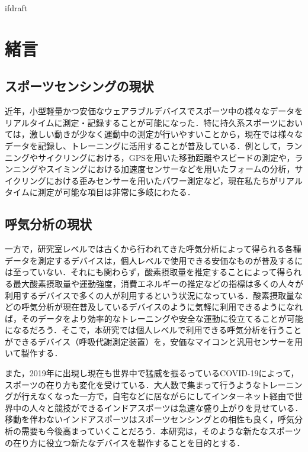 \expandafter\ifx\csname ifdraft\endcsname\relax
 
\fi

\section{緒言}

\subsection{スポーツセンシングの現状}

近年，小型軽量かつ安価なウェアラブルデバイスでスポーツ中の様々なデータをリアルタイムに測定・記録することが可能になった．特に持久系スポーツにおいては，激しい動きが少なく運動中の測定が行いやすいことから，現在では様々なデータを記録し、トレーニングに活用することが普及している．例として，ランニングやサイクリングにおける，GPSを用いた移動距離やスピードの測定や，ランニングやスイミングにおける加速度センサーなどを用いたフォームの分析，サイクリングにおける歪みセンサーを用いたパワー測定など，現在私たちがリアルタイムに測定が可能な項目は非常に多岐にわたる．

\subsection{呼気分析の現状}

一方で，研究室レベルでは古くから行われてきた呼気分析によって得られる各種データを測定するデバイスは，個人レベルで使用できる安価なものが普及するには至っていない．それにも関わらず，酸素摂取量を推定することによって得られる最大酸素摂取量や運動強度，消費エネルギーの推定などの指標は多くの人々が利用するデバイスで多くの人が利用するという状況になっている．酸素摂取量などの呼気分析が現在普及しているデバイスのように気軽に利用できるようになれば，そのデータをより効率的なトレーニングや安全な運動に役立てることが可能になるだろう．そこで，本研究では個人レベルで利用できる呼気分析を行うことができるデバイス（呼吸代謝測定装置）を，安価なマイコンと汎用センサーを用いて製作する．

また，2019年に出現し現在も世界中で猛威を振るっているCOVID-19によって，スポーツの在り方も変化を受けている．大人数で集まって行うようなトレーニングが行えなくなった一方で，自宅などに居ながらにしてインターネット経由で世界中の人々と競技ができるインドアスポーツは急速な盛り上がりを見せている．移動を伴わないインドアスポーツはスポーツセンシングとの相性も良く，呼気分析の需要も今後高まっていくことだろう．本研究は，そのような新たなスポーツの在り方に役立つ新たなデバイスを製作することを目的とする．


